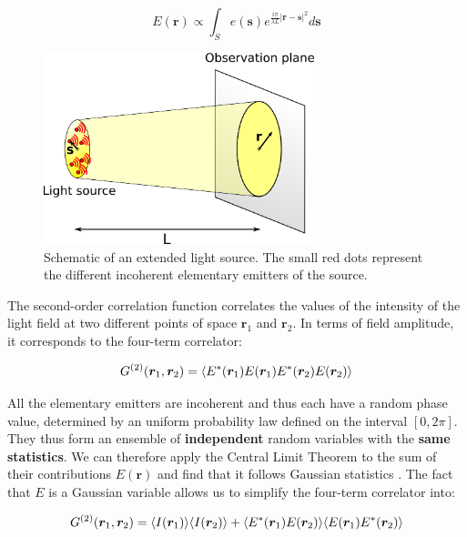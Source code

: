 \begin{equation}
    E(\bm{r}) \propto \int_{S} e(\bm{s}) e^{\frac{i \pi}{\lambda L}|\bm{r}-\bm{s}|^{2}} d \bm{s}
    \label{eq:amp_HBT}
\end{equation}

\begin{figure}
    \centering
    \includegraphics[width=0.7\textwidth]{Fig/Chapter1/source_and_plane.png}
    \caption[Schematic of an extended light source]{Schematic of an extended light source. The small red dots represent the different incoherent elementary emitters of the source.}
    \label{fig:source_and_plane}
\end{figure}

The second-order correlation function correlates the values of the intensity of the light field at two different points of space $\bm{r}_1$ and $\bm{r}_2$. In terms of field amplitude, it corresponds to the four-term correlator:

\begin{equation}
    G^{(2)} (\bm{r}_1,\bm{r}_2) = \langle E^*(\bm{r}_1) E(\bm{r}_1) E^*(\bm{r}_2) E(\bm{r}_2)\rangle
\end{equation}

\noindent All the elementary emitters are incoherent and thus each have a random phase value, determined by an uniform probability law defined on the interval $[0,2\pi]$. They thus form an ensemble of \textbf{independent} random variables with the \textbf{same statistics}. We can therefore apply the Central Limit Theorem to the sum of their contributions $E(\bm{r})$ and find that it follows Gaussian statistics \cite{goodman2007speckle}. The fact that $E$ is a Gaussian variable allows us to simplify the four-term correlator into:

\begin{equation}
     G^{(2)} (\bm{r}_1,\bm{r}_2) = \langle I(\bm{r}_1)\rangle \langle I(\bm{r}_2)\rangle + \langle E^*(\bm{r}_1) E(\bm{r}_2)\rangle \langle E(\bm{r}_1) E^*(\bm{r}_2)\rangle
\end{equation}

